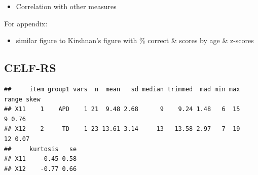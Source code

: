 \documentclass[a4paper, twoside]{templates/ociamthesis}
\providecommand{\tightlist}{%
  \setlength{\itemsep}{0pt}\setlength{\parskip}{0pt}}
\begin{document}
\begin{table}

\caption{\label{tab:ENVASA-Wilk}ENVASA standard residuals (z-scores) descriptive statistics and group difference analysis by test measures.}
\centering
{}
\end{table}

\begin{itemize}
\tightlist
\item
  Correlation with other measures
\end{itemize}

For appendix:

\begin{itemize}
\tightlist
\item
  similar figure to Kirshnan's figure with \% correct \& scores by age \& z-scores
\end{itemize}

\hypertarget{celf-rs-1}{%
\subsection{CELF-RS}\label{celf-rs-1}}

\begin{verbatim}
##     item group1 vars  n  mean   sd median trimmed  mad min max range skew
## X11    1    APD    1 21  9.48 2.68      9    9.24 1.48   6  15     9 0.76
## X12    2     TD    1 23 13.61 3.14     13   13.58 2.97   7  19    12 0.07
##     kurtosis   se
## X11    -0.45 0.58
## X12    -0.77 0.66
\end{verbatim}
\end{document}
